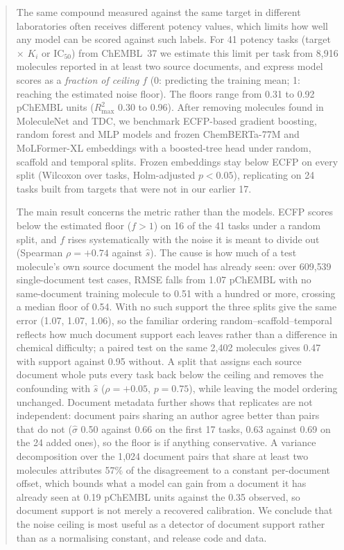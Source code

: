 \begin{abstract}
The same compound measured against the same target in different laboratories often receives different potency values, which limits how well any model can be scored against such labels. For 41 potency tasks (target $\times$ $K_i$ or $\mathrm{IC}_{50}$) from ChEMBL~37 we estimate this limit per task from 8{,}916 molecules reported in at least two source documents, and express model scores as a \emph{fraction of ceiling} $f$ (0: predicting the training mean; 1: reaching the estimated noise floor). The floors range from 0.31 to 0.92 pChEMBL units ($R^2_{\max}$ 0.30 to 0.96). After removing molecules found in MoleculeNet and TDC, we benchmark ECFP-based gradient boosting, random forest and MLP models and frozen ChemBERTa-77M and MoLFormer-XL embeddings with a boosted-tree head under random, scaffold and temporal splits. Frozen embeddings stay below ECFP on every split (Wilcoxon over tasks, Holm-adjusted $p<0.05$), replicating on 24 tasks built from targets that were not in our earlier 17.

The main result concerns the metric rather than the models. ECFP scores below the estimated floor ($f>1$) on 16 of the 41 tasks under a random split, and $f$ rises systematically with the noise it is meant to divide out (Spearman $\rho=+0.74$ against $\hat s$). The cause is how much of a test molecule's own source document the model has already seen: over 609{,}539 single-document test cases, RMSE falls from 1.07 pChEMBL with no same-document training molecule to 0.51 with a hundred or more, crossing a median floor of 0.54. With no such support the three splits give the same error (1.07, 1.07, 1.06), so the familiar ordering random--scaffold--temporal reflects how much document support each leaves rather than a difference in chemical difficulty; a paired test on the same 2{,}402 molecules gives 0.47 with support against 0.95 without. A split that assigns each source document whole puts every task back below the ceiling and removes the confounding with $\hat s$ ($\rho=+0.05$, $p=0.75$), while leaving the model ordering unchanged. Document metadata further shows that replicates are not independent: document pairs sharing an author agree better than pairs that do not ($\hat\sigma$ 0.50 against 0.66 on the first 17 tasks, 0.63 against 0.69 on the 24 added ones), so the floor is if anything conservative. A variance decomposition over the 1{,}024 document pairs that share at least two molecules attributes 57\% of the disagreement to a constant per-document offset, which bounds what a model can gain from a document it has already seen at 0.19 pChEMBL units against the 0.35 observed, so document support is not merely a recovered calibration. We conclude that the noise ceiling is most useful as a detector of document support rather than as a normalising constant, and release code and data.
\end{abstract}
